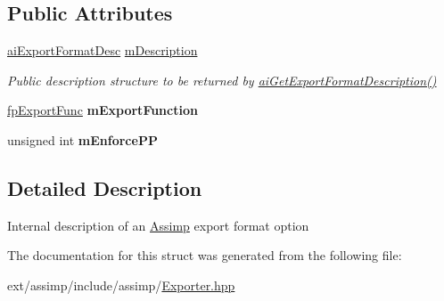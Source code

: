 \subsection*{Public Attributes}
\begin{DoxyCompactItemize}
\item 
\hypertarget{struct_assimp_1_1_exporter_1_1_export_format_entry_a59f8bf48e35a70ac0540c9b65d4b891d}{\hyperlink{structai_export_format_desc}{ai\-Export\-Format\-Desc} \hyperlink{struct_assimp_1_1_exporter_1_1_export_format_entry_a59f8bf48e35a70ac0540c9b65d4b891d}{m\-Description}}\label{struct_assimp_1_1_exporter_1_1_export_format_entry_a59f8bf48e35a70ac0540c9b65d4b891d}

\begin{DoxyCompactList}\small\item\em Public description structure to be returned by \hyperlink{cexport_8h_adda7f2e6611f719af6c8a4a0bef0a0a2}{ai\-Get\-Export\-Format\-Description()} \end{DoxyCompactList}\item 
\hypertarget{struct_assimp_1_1_exporter_1_1_export_format_entry_a5cf4464ae6f7f7d92aaade27f1e545f5}{\hyperlink{class_assimp_1_1_exporter_a2e0f2340bca5a7e4f443cbc256928e88}{fp\-Export\-Func} {\bfseries m\-Export\-Function}}\label{struct_assimp_1_1_exporter_1_1_export_format_entry_a5cf4464ae6f7f7d92aaade27f1e545f5}

\item 
\hypertarget{struct_assimp_1_1_exporter_1_1_export_format_entry_aefb2d077aebc473ce9a6e38fd883f181}{unsigned int {\bfseries m\-Enforce\-P\-P}}\label{struct_assimp_1_1_exporter_1_1_export_format_entry_aefb2d077aebc473ce9a6e38fd883f181}

\end{DoxyCompactItemize}


\subsection{Detailed Description}
Internal description of an \hyperlink{namespace_assimp}{Assimp} export format option 

The documentation for this struct was generated from the following file\-:\begin{DoxyCompactItemize}
\item 
ext/assimp/include/assimp/\hyperlink{_exporter_8hpp}{Exporter.\-hpp}\end{DoxyCompactItemize}
